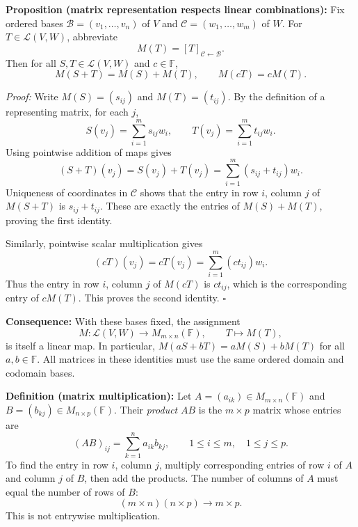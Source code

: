 \documentclass[a4paper,11pt,abstract=true]{scrartcl}
\theoremstyle{dotlessP}
\theoremstyle{dotlessS}
\theoremstyle{remark}
\theoremstyle{definition}
\begin{document}
\begin{claim_box}
\textbf{Proposition (matrix representation respects linear combinations):}
Fix ordered bases $\mathcal{B}=(v_1,\ldots,v_n)$ of $V$ and
$\mathcal{C}=(w_1,\ldots,w_m)$ of $W$. For
$T\in\mathcal{L}(V,W)$, abbreviate
\[
M(T)={[T]}_{\mathcal{C}\leftarrow\mathcal{B}}.
\]
Then for all $S,T\in\mathcal{L}(V,W)$ and $c\in\mathbb{F}$,
\[
M(S+T)=M(S)+M(T),\qquad M(cT)=cM(T).
\]

\textit{Proof:} Write $M(S)=(s_{ij})$ and $M(T)=(t_{ij})$. By the
definition of a representing matrix, for each $j$,
\[
S(v_j)=\sum_{i=1}^m s_{ij}w_i,
\qquad T(v_j)=\sum_{i=1}^m t_{ij}w_i.
\]
Using pointwise addition of maps gives
\[
(S+T)(v_j)=S(v_j)+T(v_j)
=\sum_{i=1}^m(s_{ij}+t_{ij})w_i.
\]
Uniqueness of coordinates in $\mathcal{C}$ shows that the entry in row
$i$, column $j$ of $M(S+T)$ is $s_{ij}+t_{ij}$. These are exactly the
entries of $M(S)+M(T)$, proving the first identity.

Similarly, pointwise scalar multiplication gives
\[
(cT)(v_j)=cT(v_j)=\sum_{i=1}^m(ct_{ij})w_i.
\]
Thus the entry in row $i$, column $j$ of $M(cT)$ is $ct_{ij}$, which
is the corresponding entry of $cM(T)$. This proves the second identity.
\hfill$\square$
\end{claim_box}

\begin{claim_box}
\textbf{Consequence:} With these bases fixed, the assignment
\[
M:\mathcal{L}(V,W)\longrightarrow M_{m\times n}(\mathbb{F}),
\qquad T\longmapsto M(T),
\]
is itself a linear map. In particular,
$M(aS+bT)=aM(S)+bM(T)$ for all $a,b\in\mathbb{F}$.
All matrices in these identities must use the same ordered domain and
codomain bases.
\end{claim_box}

\begin{definition_box}
\textbf{Definition (matrix multiplication):} Let
$A=(a_{ik})\in M_{m\times n}(\mathbb{F})$ and
$B=(b_{kj})\in M_{n\times p}(\mathbb{F})$. Their \emph{product}
$AB$ is the $m\times p$ matrix whose entries are
\[
{(AB)}_{ij}=\sum_{k=1}^n a_{ik}b_{kj},
\qquad 1\leq i\leq m,\quad 1\leq j\leq p.
\]
To find the entry in row $i$, column $j$, multiply corresponding entries
of row $i$ of $A$ and column $j$ of $B$, then add the products.
The number of columns of $A$ must equal the number of rows of $B$:
\[
(m\times n)(n\times p)\longrightarrow m\times p.
\]
This is not entrywise multiplication.
\end{definition_box}
\end{document}
